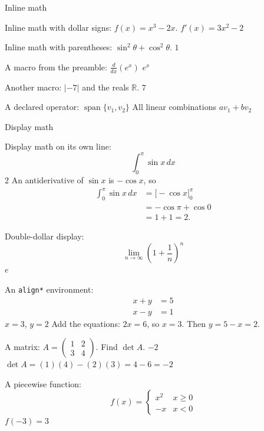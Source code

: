 \documentclass{article}
\newcommand{\R}{\mathbb{R}}
\newcommand{\dd}[1]{\frac{d}{d#1}}
\newcommand{\abs}[1]{\left|#1\right|}
\DeclareMathOperator{\Span}{span}
\begin{document}
\begin{category}{Inline math}
  \begin{clue}
    Inline math with dollar signs: $f(x) = x^3 - 2x$.
  \response
    $f'(x) = 3x^2 - 2$
  \end{clue}
  \begin{clue}
    Inline math with parentheses: \(\sin^2\theta + \cos^2\theta\).
  \response
    \(1\)
  \end{clue}
  \begin{clue}
    A macro from the preamble: $\dd{x}\left(e^{x}\right)$
  \response
    $e^x$
  \end{clue}
  \begin{clue}
    Another macro: $\abs{-7}$ and the reals $\R$.
  \response
    $7$
  \end{clue}
  \begin{clue}
    A declared operator: $\Span\{v_1, v_2\}$
  \response
    All linear combinations $a v_1 + b v_2$
  \end{clue}
\end{category}

\begin{category}{Display math}
  \begin{clue}
    Display math on its own line:
    \[ \int_0^{\pi} \sin x \, dx \]
  \response
    $2$
  \solution
    An antiderivative of $\sin x$ is $-\cos x$, so
    \begin{align*}
      \int_0^{\pi} \sin x \, dx &= \Big[-\cos x\Big]_0^{\pi} \\
        &= -\cos\pi + \cos 0 \\
        &= 1 + 1 = 2.
    \end{align*}
  \end{clue}
  \begin{clue}
    Double-dollar display:
    $$ \lim_{n \to \infty} \left(1 + \frac{1}{n}\right)^n $$
  \response
    $e$
  \end{clue}
  \begin{clue}
    An \texttt{align*} environment:
    \begin{align*}
      x + y &= 5 \\
      x - y &= 1
    \end{align*}
  \response
    $x = 3$, $y = 2$
  \solution
    Add the equations: $2x = 6$, so $x = 3$. Then $y = 5 - x = 2$.
  \end{clue}
  \begin{clue}[dailydouble]
    A matrix: $A = \begin{pmatrix} 1 & 2 \\ 3 & 4 \end{pmatrix}$. Find $\det A$.
  \response
    $-2$
  \solution
    $\det A = (1)(4) - (2)(3) = 4 - 6 = -2$
  \end{clue}
  \begin{clue}
    A piecewise function:
    \[ f(x) = \begin{cases} x^2 & x \ge 0 \\ -x & x < 0 \end{cases} \]
  \response
    $f(-3) = 3$
  \end{clue}
\end{category}
\end{document}
